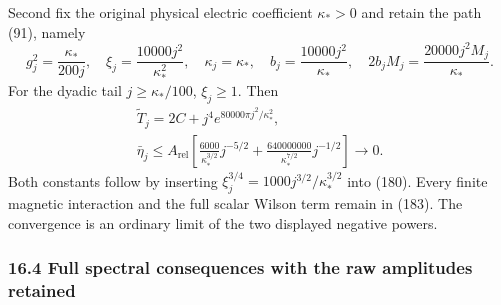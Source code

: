 \documentclass[
  11pt,
]{article}
\begin{document}
Second fix the original physical electric coefficient \(\kappa_*>0\) and
retain the path (91), namely \[
 g_j^2=\frac{\kappa_*}{200j},\quad
 \xi_j=\frac{10000j^2}{\kappa_*^2},\quad
 \kappa_j=\kappa_*,\quad b_j=\frac{10000j^2}{\kappa_*},
 \quad 2b_jM_j=\frac{20000j^2M_j}{\kappa_*}.
 \tag{183}
\] For the dyadic tail \(j\ge\kappa_*/100\), \(\xi_j\ge1\). Then \[
 \begin{gathered}
 \widetilde T_j=2C+j^4e^{80000\pi j^2/\kappa_*^2},\\
 \bar\eta_j\le A_{\mathrm{rel}}
 \left[\frac{6000}{\kappa_*^{3/2}}j^{-5/2}
       +\frac{640000000}{\kappa_*^{7/2}}j^{-1/2}\right]
 \longrightarrow0 .
 \end{gathered}
 \tag{184}
\] Both constants follow by inserting
\(\xi_j^{3/4}=1000j^{3/2}/\kappa_*^{3/2}\) into (180). Every finite
magnetic interaction and the full scalar Wilson term remain in (183).
The convergence is an ordinary limit of the two displayed negative
powers.

\subsubsection{16.4 Full spectral consequences with the raw amplitudes
retained}\label{full-spectral-consequences-with-the-raw-amplitudes-retained}
\end{document}
